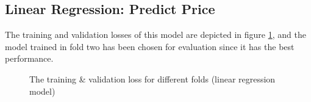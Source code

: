 \documentclass[12pt,twoside]{report}
\begin{document}
\subsection{Linear Regression: Predict Price}
The training and validation losses of this model are depicted in figure \ref{linear_regression_fold_5}, and the model trained in fold two has been chosen for evaluation since it has the best performance. 
\\
\begin{figure}[!htbp]
	\centering
	\hfill
	\hfill
	\hfil
	\hfil
	\caption{The training \& validation loss for different folds (linear regression model)}
	\label{linear_regression_fold_5}
\end{figure}
\end{document}
